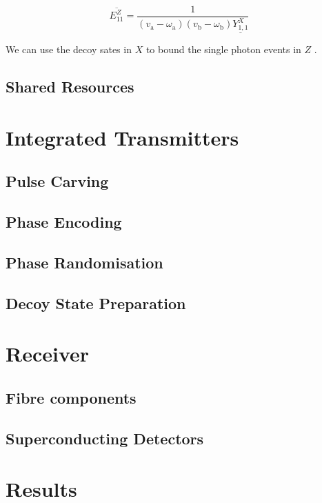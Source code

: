 \begin{equation}
	\overline{E_{11}^Z} = \frac{1}{\left(v_{\mathrm{a}}-\omega_{\mathrm{a}}\right)\left(v_{\mathrm{b}}-\omega_{\mathrm{b}}\right) \underline{Y^{X}_{1,1}}}
\end{equation}

We can use the decoy sates in $X$ to bound the single photon events in $Z$ \cite{zhou2016}.

\subsection{Shared Resources}

\section{Integrated Transmitters}

\subsection{Pulse Carving}

\subsection{Phase Encoding}

\subsection{Phase Randomisation}

\subsection{Decoy State Preparation}

\section{Receiver}

\subsection{Fibre components}

\subsection{Superconducting Detectors}

\section{Results}



